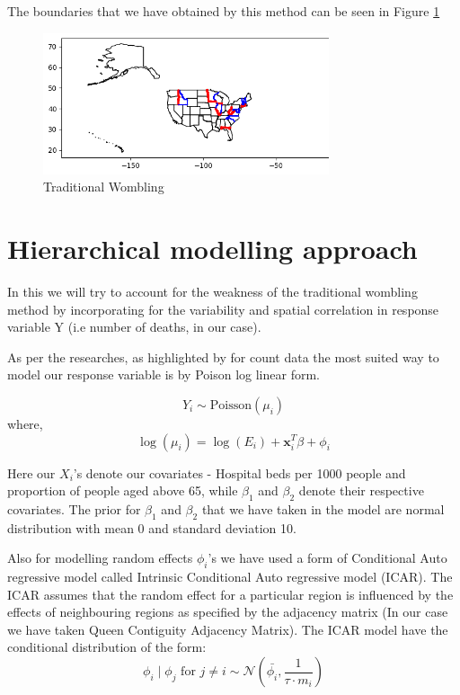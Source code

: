 \documentclass[enabledeprecatedfontcommands,parskip=half,twoside=semi,BCOR=0mm]{scrreprt}
\numberwithin{equation}{chapter}
\theoremstyle{definition}
\theoremstyle{remark}
\begin{document}
    The boundaries that we have obtained by this method can be seen in Figure \ref{fig:Figure 3}
    \begin{figure}[h]
    \centering
    \includegraphics[width=0.75\textwidth]{Traditional.png}
    \caption{Traditional Wombling}
    \label{fig:Figure 3}
    \end{figure}
    
    \section{Hierarchical modelling approach}
    
    In this we will try to account for the weakness of the traditional wombling method by incorporating for the variability and spatial correlation in response variable Y (i.e number of deaths, in our case).
    
    As per the researches, as highlighted by \cite{Lu_Carlin.2005} for count data the most suited way to model our response variable is by Poison log linear form.
    
    \[ Y_i \sim \text{Poisson}(\mu_i) \]
    where,
    \[
    \log(\mu_i) = \log(E_i) + \mathbf{x}_i^T \beta + \phi_i
    \]
    
    Here our \(X_i\)'s denote our covariates - Hospital beds per 1000 people and proportion of people aged above 65, while \(\beta_1\) and \(\beta_2\) denote their respective covariates. The prior for \(\beta_1\) and \(\beta_2\) that we have taken in the model are normal distribution with mean 0 and standard deviation 10.
    
    Also for modelling random effects \(\phi_i\)'s we have used a form of Conditional Auto regressive model called Intrinsic Conditional Auto regressive model (ICAR). The ICAR assumes that the random effect for a particular region is influenced by the effects of neighbouring regions as specified by the adjacency matrix (In our case we have taken Queen Contiguity Adjacency Matrix). The ICAR model have the conditional distribution of the form:
    \[
    \phi_i \mid \phi_j \text{ for } j \neq i \sim \mathcal{N}\left(\bar{\phi_i}, \frac{1}{\tau \cdot m_i}\right)
    \]
\end{document}
